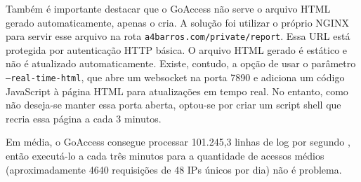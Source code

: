 Também é importante destacar que o GoAccess não serve o arquivo HTML gerado 
automaticamente, apenas o cria. A solução foi utilizar o próprio NGINX para 
servir esse arquivo na rota \texttt{a4barros.com/private/report}. Essa URL está 
protegida por autenticação HTTP básica. O arquivo HTML gerado é estático e não é 
atualizado automaticamente. Existe, contudo, a opção de usar o parâmetro 
\texttt{--real-time-html}, que abre um websocket na porta 7890 e adiciona um código 
JavaScript à página HTML para atualizações em tempo real. No entanto, como não 
deseja-se manter essa porta aberta, optou-se por criar um script shell que recria essa
página a cada 3 minutos.



Em média, o GoAccess consegue processar 101.245,3 linhas de log por segundo 
\cite{goaccess-speed}, então executá-lo a cada três minutos para a quantidade de 
acessos médios (aproximadamente 4640 requisições de 48 IPs únicos por dia) não 
é problema.